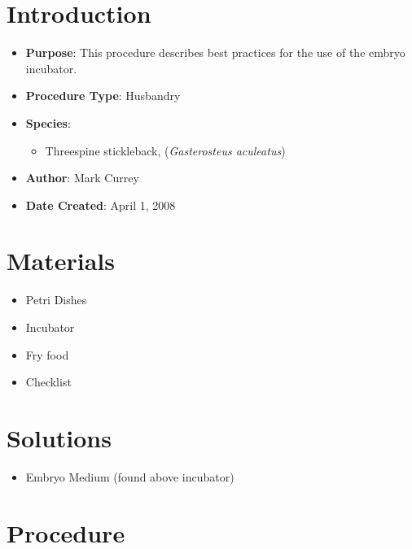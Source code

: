 \documentclass[
  letterpaper,
  DIV=11,
  numbers=noendperiod]{scrreprt}
\providecommand{\tightlist}{%
  \setlength{\itemsep}{0pt}\setlength{\parskip}{0pt}}\usepackage{longtable,booktabs,array}
\begin{document}
\hypertarget{introduction-22}{%
\section{Introduction}\label{introduction-22}}

\begin{itemize}
\tightlist
\item
  \textbf{Purpose}: This procedure describes best practices for the use
  of the embryo incubator.
\item
  \textbf{Procedure Type}: Husbandry
\item
  \textbf{Species}:

  \begin{itemize}
  \tightlist
  \item
    Threespine stickleback, (\emph{Gasterosteus aculeatus})
  \end{itemize}
\item
  \textbf{Author}: Mark Currey
\item
  \textbf{Date Created}: April 1, 2008
\end{itemize}

\hypertarget{materials-20}{%
\section{Materials}\label{materials-20}}

\begin{itemize}
\tightlist
\item
  Petri Dishes
\item
  Incubator
\item
  Fry food
\item
  Checklist
\end{itemize}

\hypertarget{solutions-17}{%
\section{Solutions}\label{solutions-17}}

\begin{itemize}
\tightlist
\item
  Embryo Medium (found above incubator)
\end{itemize}

\hypertarget{procedure-22}{%
\section{Procedure}\label{procedure-22}}
\end{document}
